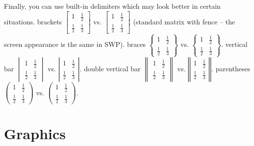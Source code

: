 \documentclass{article}
\begin{document}
Finally, you can use built-in delimiters which may look better in certain
situations. brackets $%
\begin{bmatrix}
1 & \frac{1}{2} \\ 
\frac{1}{2} & \frac{1}{3}%
\end{bmatrix}%
$ vs. $\left[ 
\begin{array}{cc}
1 & \frac{1}{2} \\ 
\frac{1}{2} & \frac{1}{3}%
\end{array}%
\right] $ (standard matrix with fence -- the screen appearance is the same
in SWP). braces $%
\begin{Bmatrix}
1 & \frac{1}{2} \\ 
\frac{1}{2} & \frac{1}{3}%
\end{Bmatrix}%
$ vs. $\left\{ 
\begin{array}{cc}
1 & \frac{1}{2} \\ 
\frac{1}{2} & \frac{1}{3}%
\end{array}%
\right\} $. vertical bar $%
\begin{vmatrix}
1 & \frac{1}{2} \\ 
\frac{1}{2} & \frac{1}{3}%
\end{vmatrix}%
$ vs. $\left\vert 
\begin{array}{cc}
1 & \frac{1}{2} \\ 
\frac{1}{2} & \frac{1}{3}%
\end{array}%
\right\vert $. double vertical bar $%
\begin{Vmatrix}
1 & \frac{1}{2} \\ 
\frac{1}{2} & \frac{1}{3}%
\end{Vmatrix}%
$ vs. $\left\Vert 
\begin{array}{cc}
1 & \frac{1}{2} \\ 
\frac{1}{2} & \frac{1}{3}%
\end{array}%
\right\Vert $. parentheses $%
\begin{pmatrix}
1 & \frac{1}{2} \\ 
\frac{1}{2} & \frac{1}{3}%
\end{pmatrix}%
$ vs. $\left( 
\begin{array}{cc}
1 & \frac{1}{2} \\ 
\frac{1}{2} & \frac{1}{3}%
\end{array}%
\right) $.

\section{Graphics}
\end{document}
